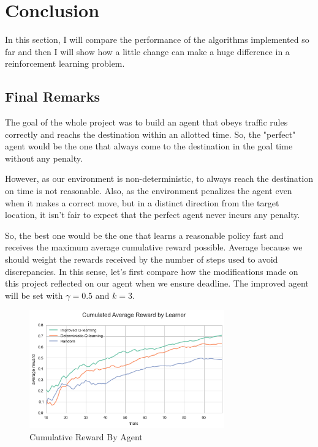 \documentclass[a4paper]{article}
\begin{document}

\section{Conclusion}
\label{sec:conclusion}
In this section, I will compare the performance of the algorithms implemented so far and then I will show how a little change can make a huge difference in a reinforcement learning problem.

\subsection{Final Remarks}
The goal of the whole project was to build an agent that obeys traffic rules correctly and reachs the destination within an allotted time. So, the "perfect" agent would be the one that always come to the destination in the goal time without any penalty.

However, as our environment is non-deterministic, to always reach the destination on time is not reasonable. Also, as the environment penalizes the agent even when it makes a correct move, but in a distinct direction from the target location, it isn't fair to expect that the perfect agent never incurs any penalty.

So, the best one would be the one that learns a reasonable policy fast and receives the maximum average cumulative reward possible. Average because we should weight the rewards received by the number of steps used to avoid discrepancies. In this sense, let's first compare how the modifications made on this project reflected on our agent when we ensure deadline. The improved agent will be set with $\gamma=0.5$ and $k=3$.


\begin{figure}[ht!]
\centering
\includegraphics[width=0.75\textwidth]{images/performance_comparition.png}
\caption{\label{fig:perf_compr}Cumulative Reward By Agent}
\end{figure}
\end{document}
